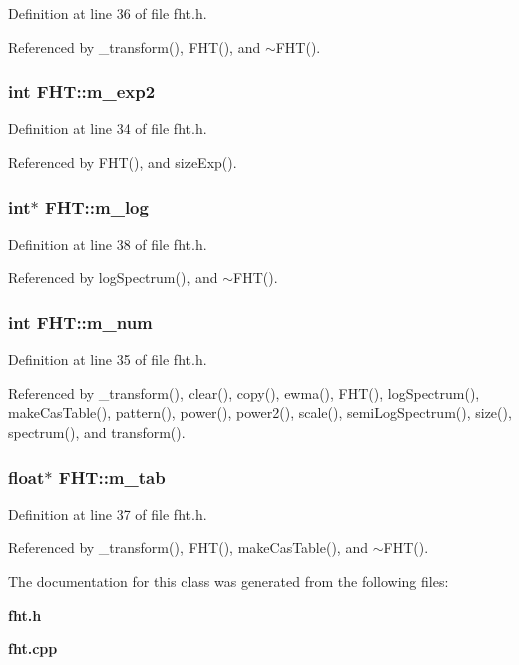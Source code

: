 Definition at line 36 of file fht.h.

Referenced by \_\-transform(), FHT(), and $\sim$FHT().
\subsubsection{\setlength{\rightskip}{0pt plus 5cm}int {\bf FHT::m\_\-exp2}\hspace{0.3cm}{\tt  [private]}}\label{classFHT_FHTr0}




Definition at line 34 of file fht.h.

Referenced by FHT(), and size\-Exp().
\subsubsection{\setlength{\rightskip}{0pt plus 5cm}int$\ast$ {\bf FHT::m\_\-log}\hspace{0.3cm}{\tt  [private]}}\label{classFHT_FHTr4}




Definition at line 38 of file fht.h.

Referenced by log\-Spectrum(), and $\sim$FHT().
\subsubsection{\setlength{\rightskip}{0pt plus 5cm}int {\bf FHT::m\_\-num}\hspace{0.3cm}{\tt  [private]}}\label{classFHT_FHTr1}




Definition at line 35 of file fht.h.

Referenced by \_\-transform(), clear(), copy(), ewma(), FHT(), log\-Spectrum(), make\-Cas\-Table(), pattern(), power(), power2(), scale(), semi\-Log\-Spectrum(), size(), spectrum(), and transform().
\subsubsection{\setlength{\rightskip}{0pt plus 5cm}float$\ast$ {\bf FHT::m\_\-tab}\hspace{0.3cm}{\tt  [private]}}\label{classFHT_FHTr3}




Definition at line 37 of file fht.h.

Referenced by \_\-transform(), FHT(), make\-Cas\-Table(), and $\sim$FHT().

The documentation for this class was generated from the following files:\begin{CompactItemize}
\item 
{\bf fht.h}\item 
{\bf fht.cpp}\end{CompactItemize}

